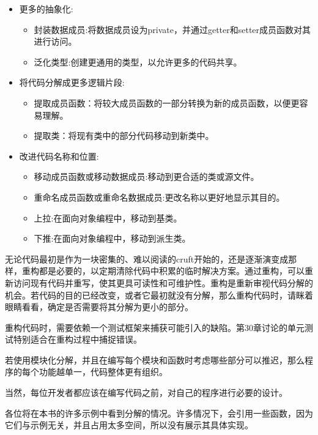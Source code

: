 \begin{itemize}
\item
更多的抽象化:

\begin{itemize}
\item
封装数据成员:将数据成员设为private，并通过getter和setter成员函数对其进行访问。

\item
泛化类型:创建更通用的类型，以允许更多的代码共享。
\end{itemize}

\item
将代码分解成更多逻辑片段:

\begin{itemize}
\item
提取成员函数：将较大成员函数的一部分转换为新的成员函数，以便更容易理解。

\item
提取类：将现有类中的部分代码移动到新类中。
\end{itemize}

\item
改进代码名称和位置:

\begin{itemize}
\item
移动成员函数或移动数据成员:移动到更合适的类或源文件。

\item
重命名成员函数或重命名数据成员:更改名称以更好地显示其目的。

\item
上拉:在面向对象编程中，移动到基类。

\item
下推:在面向对象编程中，移动到派生类。
\end{itemize}
\end{itemize}

无论代码最初是作为一块密集的、难以阅读的cruft开始的，还是逐渐演变成那样，重构都是必要的，以定期清除代码中积累的临时解决方案。通过重构，可以重新访问现有代码并重写，使其更具可读性和可维护性。重构是重新审视代码分解的机会。若代码的目的已经改变，或者它最初就没有分解，那么重构代码时，请眯着眼睛看看，确定是否需要将其分解为更小的部分。

重构代码时，需要依赖一个测试框架来捕获可能引入的缺陷。第30章讨论的单元测试特别适合在重构过程中捕捉错误。


若使用模块化分解，并且在编写每个模块和函数时考虑哪些部分可以推迟，那么程序的每个功能越单一，代码整体更有组织。

当然，每位开发者都应该在编写代码之前，对自己的程序进行必要的设计。


各位将在本书的许多示例中看到分解的情况。许多情况下，会引用一些函数，因为它们与示例无关，并且占用太多空间，所以没有展示其具体实现。
